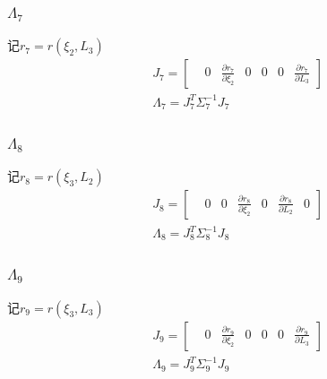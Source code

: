 \documentclass[UTF8]{ctexart}
\begin{document}
\subsubsection{$\Lambda_7$}
\indent 记$r_7=r(\xi _2,L _3)$ \\
\begin{equation}
\begin{aligned}
&J_7= \begin{bmatrix}
    &0 &\frac{\partial r_7}{\partial \xi _2} &0 &0 &0 &\frac{\partial r_7}{\partial L_3}  
    \end{bmatrix}\\
&\Lambda_7=J_7^T\Sigma_7^{-1}J_7
\end{aligned}
\end{equation}

\subsubsection{$\Lambda_8$}
\indent 记$r_8=r(\xi _3,L _2)$ \\
\begin{equation}
\begin{aligned}
&J_8= \begin{bmatrix}
    &0 &0 &\frac{\partial r_8}{\partial \xi _2} &0 &\frac{\partial r_8}{\partial L_2} &0 
    \end{bmatrix}\\
&\Lambda_8=J_8^T\Sigma_8^{-1}J_8
\end{aligned}
\end{equation}

\subsubsection{$\Lambda_9$}
\indent 记$r_9=r(\xi _3,L _3)$ \\
\begin{equation}
\begin{aligned}
&J_9= \begin{bmatrix}
    &0 &\frac{\partial r_9}{\partial \xi _2} &0 &0 &0 &\frac{\partial r_9}{\partial L_3}
    \end{bmatrix}\\
&\Lambda_9=J_9^T\Sigma_9^{-1}J_9
\end{aligned}
\end{equation}
\end{document}
